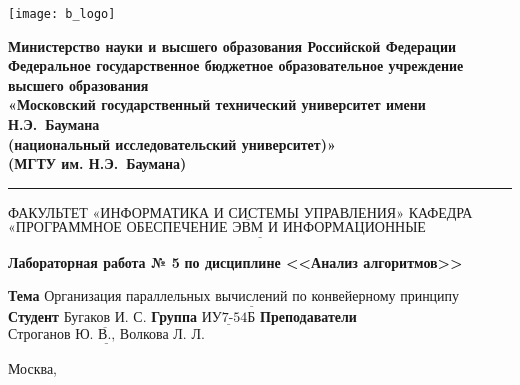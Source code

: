 \thispagestyle{empty}

\noindent \begin{minipage}{0.15\textwidth}
	\texttt{[image: b\_logo]}
\end{minipage}
\noindent\begin{minipage}{0.85\textwidth}\centering
	\textbf{Министерство науки и высшего образования Российской Федерации}\\
	\textbf{Федеральное государственное бюджетное образовательное учреждение высшего образования}\\
	\textbf{«Московский государственный технический университет имени Н.Э.~Баумана}\\
	\textbf{(национальный исследовательский университет)»}\\
	\textbf{(МГТУ им. Н.Э.~Баумана)}
\end{minipage}

\noindent\rule{\linewidth}{3pt}
\newline\newline
\noindent ФАКУЛЬТЕТ $\underline{\text{«ИНФОРМАТИКА И СИСТЕМЫ УПРАВЛЕНИЯ»}}$ \newline\newline
\noindent КАФЕДРА $\underline{\text{«ПРОГРАММНОЕ ОБЕСПЕЧЕНИЕ ЭВМ И ИНФОРМАЦИОННЫЕ ТЕХНОЛОГИИ»}}$

\vspace{1cm}

\begin{center}
	\noindent\begin{minipage}{1.3\textwidth}\centering
		\Large\textbf{  Лабораторная работа № 5}\newline
		\textbf{по дисциплине <<Анализ алгоритмов>>}\newline\newline
	\end{minipage}
\end{center}

\noindent\textbf{Тема} $\underline{\text{Организация параллельных вычислений по конвейерному принципу}}$\newline\newline
\noindent\textbf{Студент} $\underline{\text{Бугаков И. С.}}$\newline\newline
\noindent\textbf{Группа} $\underline{\text{ИУ7-54Б}}$\newline\newline
\noindent\textbf{Преподаватели} $\underline{\text{Строганов Ю. В., Волкова Л. Л.}}$\newline

\begin{center}
	\vfill
	Москва,~\the\year
\end{center}
\clearpage